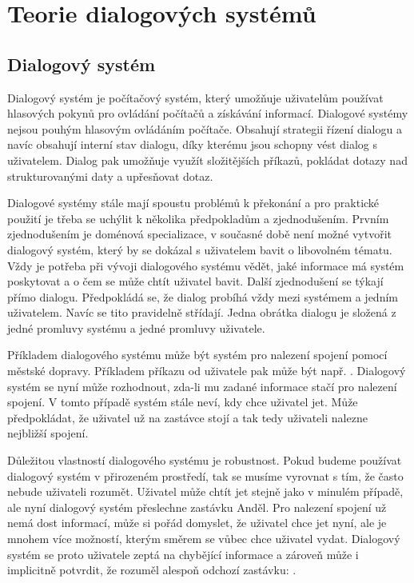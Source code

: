 \chapter{Teorie dialogových systémů}

\section{Dialogový systém}

Dialogový systém je počítačový systém, který umožňuje uživatelům používat
hlasových pokynů pro ovládání počítačů a získávání informací. Dialogové systémy
nejsou pouhým hlasovým ovládáním počítače. Obsahují strategii řízení dialogu a
navíc obsahují interní stav dialogu, díky kterému jsou schopny vést dialog s
uživatelem. Dialog pak umožňuje využít složitějších příkazů, pokládat dotazy
nad strukturovanými daty a upřesňovat dotaz.

Dialogové systémy stále mají spoustu problémů k překonání a pro praktické použití je třeba se uchýlit k několika předpokladům a zjednodušením.
Prvním zjednodušením je doménová specializace, v současné době není možné vytvořit dialogový systém, který by se dokázal s uživatelem bavit o libovolném tématu. 
Vždy je potřeba při vývoji dialogového systému vědět, jaké informace má systém poskytovat a o čem se může chtít uživatel bavit.
Další zjednodušení se týkají přímo dialogu. 
Předpokládá se, že dialog probíhá vždy mezi systémem a jedním uživatelem. Navíc se tito pravidelně střídají. Jedna obrátka dialogu je složená z jedné promluvy systému a jedné promluvy uživatele.

Příkladem dialogového systému může být systém pro nalezení spojení pomocí
městské dopravy. Příkladem příkazu od uživatele pak může být např. . Dialogový systém se nyní může rozhodnout,
zda-li mu zadané informace stačí pro nalezení spojení. V tomto případě systém
stále neví, kdy chce uživatel jet. Může předpokládat, že uživatel už na
zastávce stojí a tak tedy uživateli nalezne nejbližší spojení.

Důležitou vlastností dialogového systému je robustnost. Pokud budeme používat
dialogový systém v přirozeném prostředí, tak se musíme vyrovnat s tím, že často
nebude uživateli rozumět. Uživatel může chtít jet stejně jako v minulém
případě, ale nyní dialogový systém přeslechne zastávku Anděl. Pro nalezení
spojení už nemá dost informací, může si pořád domyslet, že uživatel chce jet
nyní, ale je mnohem více možností, kterým směrem se vůbec chce uživatel vydat.
Dialogový systém se proto uživatele zeptá na chybějící informace a zároveň může
i implicitně potvrdit, že rozuměl alespoň odchozí zastávku: .


